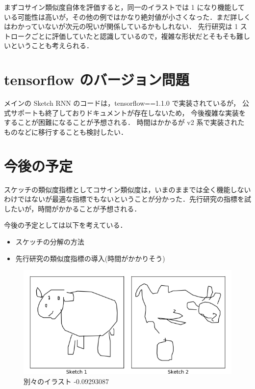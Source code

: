 \documentclass[onecolumn]{ujarticle}   %
\begin{document}
まずコサイン類似度自体を評価すると，同一のイラストでは 1 になり機能している可能性は高いが，その他の例ではかなり絶対値が小さくなった．まだ詳しくはわかっていないが次元の呪いが関係しているかもしれない．
先行研究は 1 ストロークごとに評価していたと認識しているので，複雑な形状だとそもそも難しいということも考えられる．

\section{tensorflow のバージョン問題}
メインの Sketch RNN のコードは，tensorflow==1.1.0 で実装されているが，
公式サポートも終了しておりドキュメントが存在しないため，
今後複雑な実装をすることが困難になることが予想される．
時間はかかるが v2 系で実装されたものなどに移行することも検討したい．

\section{今後の予定}
スケッチの類似度指標としてコサイン類似度は，いまのままでは全く機能しないわけではないが最適な指標でもないということが分かった．先行研究の指標を試したいが，時間がかかることが予想される．

今後の予定としては以下を考えている．
\begin{itemize}
  \item スケッチの分解の方法
  \item 先行研究の類似度指標の導入(時間がかかりそう)
\end{itemize}



\begin{figure}[th]
  \begin{center}
    \includegraphics[clip,width=140mm]{compare.png}
    \caption{別々のイラスト -0.09293087}
    \label{fig:result1}
  \end{center}
\end{figure}
\end{document}
